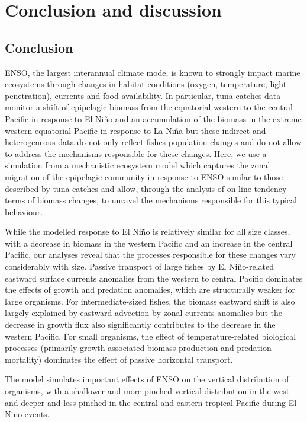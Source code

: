 \section{Conclusion and discussion}
\label{sec:conclusion}


\subsection{Conclusion}

ENSO, the largest interannual climate mode, is known to strongly impact marine ecosystems through changes in habitat conditions (oxygen, temperature, light penetration), currents and food availability. In particular, tuna catches data monitor a shift of epipelagic biomass from the equatorial western to the central Pacific in response to El Niño and an accumulation of the biomass in the extreme western equatorial Pacific in response to La Niña but these indirect and heterogeneous data do not only reflect fishes population changes and do not allow to address the mechanisms responsible for these changes. Here, we use a simulation from a mechanistic ecosystem model which captures the zonal migration of the epipelagic community in response to ENSO similar to those described by tuna catches  and allow, through the analysis of on-line tendency terms of biomass changes, to unravel the mechanisms responsible for this typical behaviour.

While the modelled response to El Niño is relatively similar for all size classes, with a decrease in biomass in the western Pacific and an increase in the central Pacific, our analyses reveal that the processes responsible for these changes vary considerably with size. Passive transport of large fishes by El Niño-related eastward surface currents anomalies from the western to central Pacific dominates the effects of growth and predation anomalies, which are structurally weaker for large organisms. For intermediate-sized fishes, the biomass eastward shift is also largely explained by eastward advection by zonal currents anomalies but the decrease in growth flux also significantly contributes to the decrease in the western Pacific. For small organisms, the effect of temperature-related biological processes (primarily growth-associated biomass production and predation mortality) dominates the effect of passive horizontal transport.

The model simulates important effects of ENSO on the vertical distribution of organisms, with a shallower and more pinched vertical distribution in the west and deeper and less pinched in the central and eastern tropical Pacific during El Nino events.

